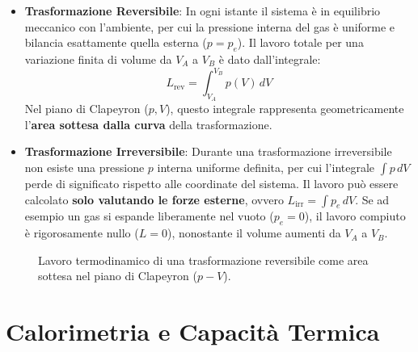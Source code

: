 \begin{itemize}
    \item \textbf{Trasformazione Reversibile}: In ogni istante il sistema è in equilibrio meccanico con l'ambiente, per cui la pressione interna del gas è uniforme e bilancia esattamente quella esterna ($p = p_e$). Il lavoro totale per una variazione finita di volume da $V_A$ a $V_B$ è dato dall'integrale:
    \begin{equation}
        \boxed{ L_{\text{rev}} = \int_{V_A}^{V_B} p(V) \, dV }
    \end{equation}
    Nel piano di Clapeyron ($p, V$), questo integrale rappresenta geometricamente l'\textbf{area sottesa dalla curva} della trasformazione.
    \item \textbf{Trasformazione Irreversibile}: Durante una trasformazione irreversibile non esiste una pressione $p$ interna uniforme definita, per cui l'integrale $\int p \, dV$ perde di significato rispetto alle coordinate del sistema. Il lavoro può essere calcolato \textbf{solo valutando le forze esterne}, ovvero $L_{\text{irr}} = \int p_e \, dV$. Se ad esempio un gas si espande liberamente nel vuoto ($p_e = 0$), il lavoro compiuto è rigorosamente nullo ($L = 0$), nonostante il volume aumenti da $V_A$ a $V_B$.
\end{itemize}

\begin{figure}[ht]
\centering
{}
\caption{Lavoro termodinamico di una trasformazione reversibile come area sottesa nel piano di Clapeyron ($p-V$).}
\end{figure}

\section{Calorimetria e Capacità Termica}

